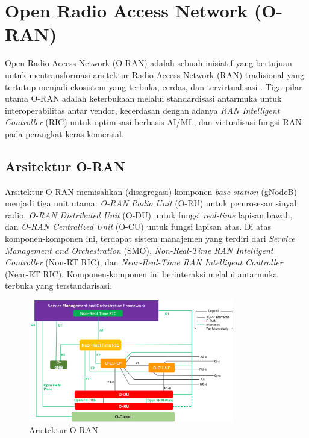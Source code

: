 \section{Open Radio Access Network (O-RAN)}
Open Radio Access Network (O-RAN) adalah sebuah inisiatif yang bertujuan untuk mentransformasi arsitektur Radio Access Network (RAN) tradisional yang tertutup menjadi ekosistem yang terbuka, cerdas, dan tervirtualisasi \cite{oran_alliance}. Tiga pilar utama O-RAN adalah keterbukaan melalui standardisasi antarmuka untuk interoperabilitas antar vendor, kecerdasan dengan adanya \textit{RAN Intelligent Controller} (RIC) untuk optimisasi berbasis AI/ML, dan virtualisasi fungsi RAN pada perangkat keras komersial.

\subsection{Arsitektur O-RAN}
Arsitektur O-RAN memisahkan (disagregasi) komponen \textit{base station} (gNodeB) menjadi tiga unit utama: \textit{O-RAN Radio Unit} (O-RU) untuk pemrosesan sinyal radio, \textit{O-RAN Distributed Unit} (O-DU) untuk fungsi \textit{real-time} lapisan bawah, dan \textit{O-RAN Centralized Unit} (O-CU) untuk fungsi lapisan atas. Di atas komponen-komponen ini, terdapat sistem manajemen yang terdiri dari \textit{Service Management and Orchestration} (SMO), \textit{Non-Real-Time RAN Intelligent Controller} (Non-RT RIC), dan \textit{Near-Real-Time RAN Intelligent Controller} (Near-RT RIC). Komponen-komponen ini berinteraksi melalui antarmuka terbuka yang terstandarisasi.

\begin{figure}[htbp]
    \centering
    \includegraphics[width=0.8\textwidth]{assets/pics/o-ran-architecture.png}
    \caption{Arsitektur O-RAN}
    \label{fig:oran_architecture}
\end{figure}

